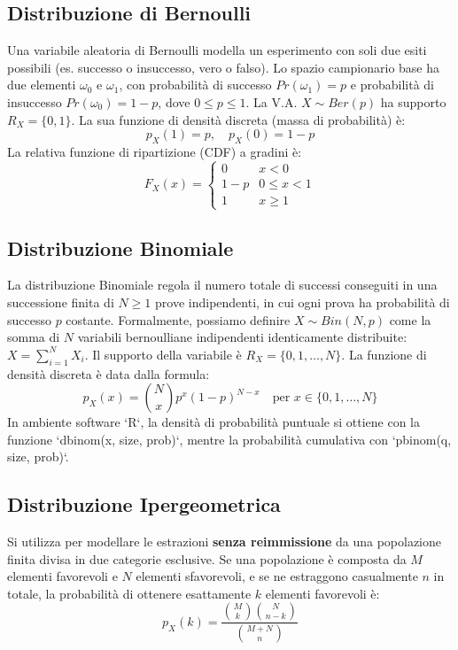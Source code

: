 \documentclass[12pt, a4paper]{article}
\begin{document}
\subsection{Distribuzione di Bernoulli}
Una variabile aleatoria di Bernoulli modella un esperimento con soli due esiti possibili (es. successo o insuccesso, vero o falso).
Lo spazio campionario base ha due elementi $\omega_0$ e $\omega_1$, con probabilità di successo $Pr(\omega_1) = p$ e probabilità di insuccesso $Pr(\omega_0) = 1-p$, dove $0 \le p \le 1$.
La V.A. $X \sim Ber(p)$ ha supporto $R_X = \{0, 1\}$.
La sua funzione di densità discreta (massa di probabilità) è:
$$ p_X(1) = p, \quad p_X(0) = 1-p $$
La relativa funzione di ripartizione (CDF) a gradini è:
$$ F_X(x) = \begin{cases} 0 & x < 0 \\ 1-p & 0 \le x < 1 \\ 1 & x \ge 1 \end{cases} $$

\subsection{Distribuzione Binomiale}
La distribuzione Binomiale regola il numero totale di successi conseguiti in una successione finita di $N \ge 1$ prove indipendenti, in cui ogni prova ha probabilità di successo $p$ costante.
Formalmente, possiamo definire $X \sim Bin(N, p)$ come la somma di $N$ variabili bernoulliane indipendenti identicamente distribuite: $X = \sum_{i=1}^N X_i$.
Il supporto della variabile è $R_X = \{0, 1, \dots, N\}$.
La funzione di densità discreta è data dalla formula:
$$ p_X(x) = \binom{N}{x} p^x (1-p)^{N-x} \quad \text{per } x \in \{0, 1, \dots, N\} $$
In ambiente software `R`, la densità di probabilità puntuale si ottiene con la funzione `dbinom(x, size, prob)`, mentre la probabilità cumulativa con `pbinom(q, size, prob)`.

\subsection{Distribuzione Ipergeometrica}
Si utilizza per modellare le estrazioni \textbf{senza reimmissione} da una popolazione finita divisa in due categorie esclusive.
Se una popolazione è composta da $M$ elementi favorevoli e $N$ elementi sfavorevoli, e se ne estraggono casualmente $n$ in totale, la probabilità di ottenere esattamente $k$ elementi favorevoli è:
$$ p_X(k) = \frac{\binom{M}{k}\binom{N}{n-k}}{\binom{M+N}{n}} $$
\end{document}
